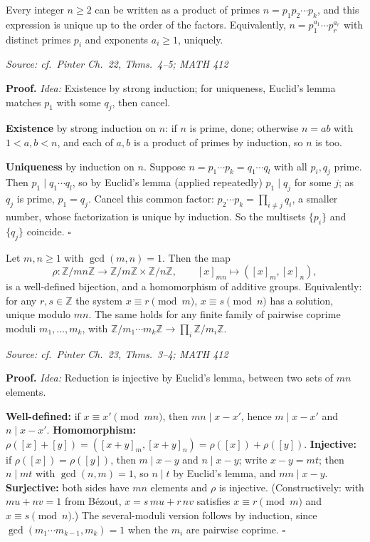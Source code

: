 \documentclass[11pt]{report}
\renewenvironment{proof}[1][Proof]{\noindent\textbf{#1.} }{\hfill$\square$\par\vspace{5pt}}
\newcommand{\srcline}[1]{\par\hfill{\footnotesize\textit{Source: #1}}}
\begin{document}
\begin{thmbox}\label{thm:unique-prime-factorization}
Every integer $n \geq 2$ can be written as a product of primes $n = p_1 p_2 \cdots p_k$, and this expression is unique up to the order of the factors. Equivalently, $n = p_1^{a_1} \cdots p_r^{a_r}$ with distinct primes $p_i$ and exponents $a_i \geq 1$, uniquely.
\srcline{cf.\ Pinter Ch.\ 22, Thms.\ 4--5; MATH 412}
\end{thmbox}

\begin{proof}
\textit{Idea:} Existence by strong induction; for uniqueness, Euclid's lemma matches $p_1$ with some $q_j$, then cancel.\par
\textbf{Existence} by strong induction on $n$: if $n$ is prime, done; otherwise $n = ab$ with $1 < a, b < n$, and each of $a, b$ is a product of primes by induction, so $n$ is too.

\textbf{Uniqueness} by induction on $n$. Suppose $n = p_1 \cdots p_k = q_1 \cdots q_l$ with all $p_i, q_j$ prime. Then $p_1 \mid q_1 \cdots q_l$, so by Euclid's lemma (applied repeatedly) $p_1 \mid q_j$ for some $j$; as $q_j$ is prime, $p_1 = q_j$. Cancel this common factor: $p_2 \cdots p_k = \prod_{i \neq j} q_i$, a smaller number, whose factorization is unique by induction. So the multisets $\{p_i\}$ and $\{q_j\}$ coincide.
\end{proof}

\begin{thmbox}\label{thm:chinese-remainder-theorem}
Let $m, n \geq 1$ with $\gcd(m, n) = 1$. Then the map
\[ \rho: \mathbb{Z}/mn\mathbb{Z} \to \mathbb{Z}/m\mathbb{Z} \times \mathbb{Z}/n\mathbb{Z}, \qquad [x]_{mn} \mapsto ([x]_m, [x]_n), \]
is a well-defined bijection, and a homomorphism of additive groups. Equivalently: for any $r, s \in \mathbb{Z}$ the system $x \equiv r \pmod m$, $x \equiv s \pmod n$ has a solution, unique modulo $mn$. The same holds for any finite family of pairwise coprime moduli $m_1, \ldots, m_k$, with $\mathbb{Z}/m_1 \cdots m_k \mathbb{Z} \to \prod_i \mathbb{Z}/m_i\mathbb{Z}$.
\srcline{cf.\ Pinter Ch.\ 23, Thms.\ 3--4; MATH 412}
\end{thmbox}

\begin{proof}
\textit{Idea:} Reduction is injective by Euclid's lemma, between two sets of $mn$ elements.\par
\textbf{Well-defined:} if $x \equiv x' \pmod{mn}$, then $mn \mid x - x'$, hence $m \mid x - x'$ and $n \mid x - x'$. \textbf{Homomorphism:} $\rho([x] + [y]) = ([x + y]_m, [x + y]_n) = \rho([x]) + \rho([y])$. \textbf{Injective:} if $\rho([x]) = \rho([y])$, then $m \mid x - y$ and $n \mid x - y$; write $x - y = mt$; then $n \mid mt$ with $\gcd(n, m) = 1$, so $n \mid t$ by Euclid's lemma, and $mn \mid x - y$. \textbf{Surjective:} both sides have $mn$ elements and $\rho$ is injective. (Constructively: with $mu + nv = 1$ from B\'ezout, $x = s\,mu + r\,nv$ satisfies $x \equiv r \pmod m$ and $x \equiv s \pmod n$.) The several-moduli version follows by induction, since $\gcd(m_1 \cdots m_{k-1}, m_k) = 1$ when the $m_i$ are pairwise coprime.
\end{proof}
\end{document}
